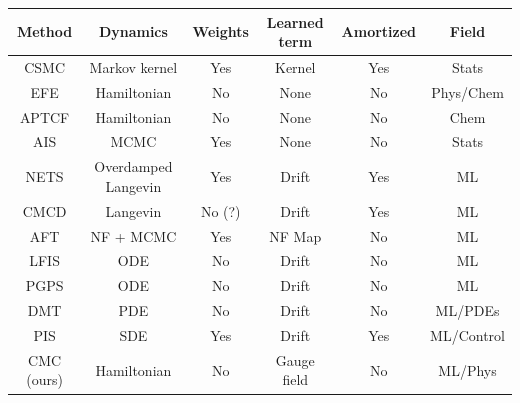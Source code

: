 \documentclass{article}
\begin{document}
\begin{center}
\begin{tabular}{||c c c c c c||} 
\label{table1}
 Method & Dynamics & Weights & Learned term & Amortized & Field \\ [0.5ex] 
 \hline
 CSMC & Markov kernel & Yes & Kernel & Yes & Stats \\ 
 EFE \cite{vaikuntanathan2011escorted} & Hamiltonian & No & None & No & Phys/Chem  \\ 
 APTCF \cite{demirplak2003adiabatic} & Hamiltonian & No & None & No & Chem  \\ 
 AIS \cite{neal2001annealed} & MCMC & Yes & None & No & Stats \\
 NETS \cite{albergo2024nets} & Overdamped Langevin & Yes & Drift & Yes & ML  \\ 
 CMCD \cite{vargas2023transport}  & Langevin & No (?) & Drift & Yes & ML  \\ 
 AFT \cite{arbel2021annealed} & NF + MCMC & Yes & NF Map & No & ML \\ 
 LFIS \cite{tian2024liouville} & ODE & No & Drift & No & ML  \\ 
 PGPS \cite{fan2024path} & ODE & No & Drift & No & ML \\ 
 DMT \cite{sun2024dynamical} & PDE & No & Drift & No & ML/PDEs \\ 
 PIS \cite{zhang2021path} & SDE & Yes & Drift & Yes & ML/Control  \\ 
 CMC (ours) & Hamiltonian & No & Gauge field & No & ML/Phys \\ 
\end{tabular}
\end{center}







\end{document}
